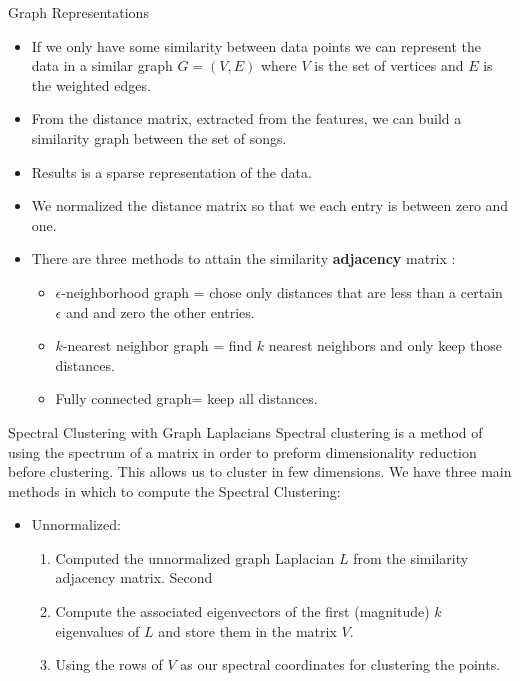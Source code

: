 \documentclass[xcolor=dvipsnames,t]{beamer} %
\begin{document}
\begin{frame}{Graph Representations}
\begin{itemize}
\item If we only have some similarity between data points we can represent the data in a similar graph $G = (V,E)$ where $V$ is the set of vertices and $E$ is the weighted edges. 
\item From the distance matrix, extracted from the features, we can build a similarity graph between the set of songs. 
\item Results is a sparse representation of the data.
\item We normalized the distance matrix so that we each entry is between zero and one. 
\item There are three methods to attain the similarity {\bf{adjacency}} matrix :
\begin{itemize}
\item  $\epsilon$-neighborhood graph = chose only distances that are less than a certain $\epsilon$ and and zero the other entries. 
\item $k$-nearest neighbor graph = find $k$ nearest neighbors and only keep those distances.
\item Fully connected graph= keep all distances. 
\end{itemize}
\end{itemize}
\end{frame}

\begin{frame}{Spectral Clustering with Graph Laplacians}
Spectral clustering is a method of using the spectrum of a matrix in order to preform dimensionality reduction before clustering. This allows us to cluster in few dimensions. We have three main  methods in which to compute the Spectral Clustering:
\begin{itemize}
\item Unnormalized:
\begin{enumerate}
\item Computed the unnormalized graph Laplacian $L$ from the similarity adjacency matrix. Second 
\item Compute the associated eigenvectors of the first (magnitude) $k$ eigenvalues of $L$ and store them in the matrix $V$. 
\item Using the rows of $V$  as our spectral coordinates for clustering the points. 
\end{enumerate}
\end{itemize}
\end{frame}
\end{document}
